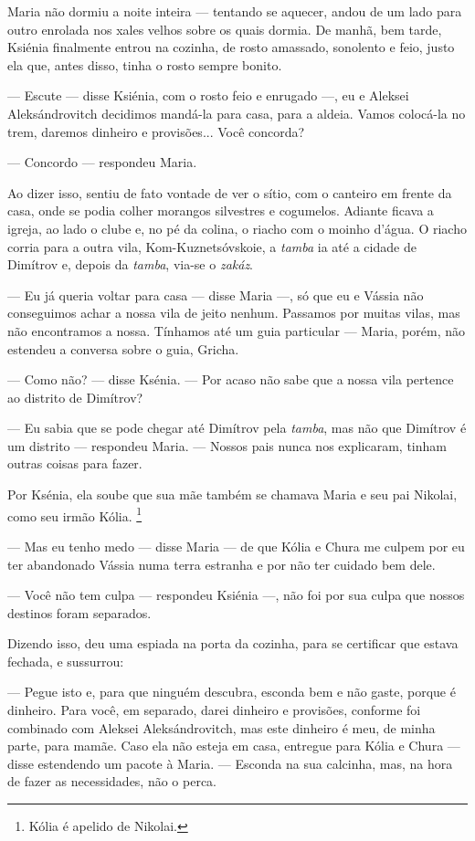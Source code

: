 Maria não dormiu a noite inteira --- tentando se aquecer, andou de um
lado para outro enrolada nos xales velhos sobre os quais dormia. De
manhã, bem tarde, Ksiénia finalmente entrou na cozinha, de rosto
amassado, sonolento e feio, justo ela que, antes disso, tinha o rosto
sempre bonito.

--- Escute --- disse Ksiénia, com o rosto feio e enrugado ---, eu e
Aleksei Aleksándrovitch decidimos mandá-la para casa, para a aldeia.
Vamos colocá-la no trem, daremos dinheiro e provisões... Você concorda?

--- Concordo --- respondeu Maria.

Ao dizer isso, sentiu de fato vontade de ver o sítio, com o canteiro em
frente da casa, onde se podia colher morangos silvestres e cogumelos.
Adiante ficava a igreja, ao lado o clube e, no pé da colina, o riacho
com o moinho d'água. O riacho corria para a outra vila,
Kom-Kuznetsóvskoie, a \emph{tamba} ia até a cidade de Dimítrov e, depois
da \emph{tamba}, via-se o \emph{zakáz}.

--- Eu já queria voltar para casa --- disse Maria ---, só que eu e
Vássia não conseguimos achar a nossa vila de jeito nenhum. Passamos por
muitas vilas, mas não encontramos a nossa. Tínhamos até um guia
particular --- Maria, porém, não estendeu a conversa sobre o guia,
Gricha.

--- Como não? --- disse Ksénia. --- Por acaso não sabe que a nossa vila
pertence ao distrito de Dimítrov?

--- Eu sabia que se pode chegar até Dimítrov pela \emph{tamba}, mas não
que Dimítrov é um distrito --- respondeu Maria. --- Nossos pais nunca
nos explicaram, tinham outras coisas para fazer.

Por Ksénia, ela soube que sua mãe também se chamava Maria e seu pai
Nikolai, como seu irmão Kólia. \footnote{Kólia é apelido de Nikolai.}

--- Mas eu tenho medo --- disse Maria --- de que Kólia e Chura me culpem
por eu ter abandonado Vássia numa terra estranha e por não ter cuidado
bem dele.

--- Você não tem culpa --- respondeu Ksiénia ---, não foi por sua culpa
que nossos destinos foram separados.

Dizendo isso, deu uma espiada na porta da cozinha, para se certificar
que estava fechada, e sussurrou:

--- Pegue isto e, para que ninguém descubra, esconda bem e não gaste,
porque é dinheiro. Para você, em separado, darei dinheiro e provisões,
conforme foi combinado com Aleksei Aleksándrovitch, mas este dinheiro é
meu, de minha parte, para mamãe. Caso ela não esteja em casa, entregue
para Kólia e Chura --- disse estendendo um pacote à Maria. --- Esconda
na sua calcinha, mas, na hora de fazer as necessidades, não o perca.

